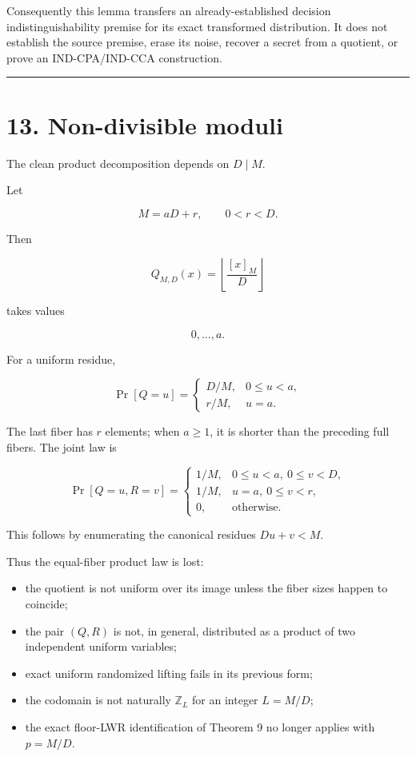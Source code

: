 \documentclass[11pt,a4paper]{article}
\providecommand{\tightlist}{\setlength{\itemsep}{0pt}\setlength{\parskip}{0pt}}
\begin{document}
Consequently this lemma transfers an already-established decision indistinguishability premise for its exact transformed distribution. It does not establish the source premise, erase its noise, recover a secret from a quotient, or prove an IND-CPA/IND-CCA construction.

\begin{center}\rule{0.5\linewidth}{0.5pt}\end{center}

\section{13. Non-divisible moduli}\label{non-divisible-moduli}

The clean product decomposition depends on \(D\mid M\).

Let

\[
M=aD+r,\qquad0<r<D.
\]

Then

\[
Q_{M,D}(x)
=
\left\lfloor\frac{[x]_M}{D}\right\rfloor
\]

takes values

\[
0,\ldots,a.
\]

For a uniform residue,

\[
\Pr[Q=u]
=
\begin{cases}
D/M,&0\le u<a,\\
r/M,&u=a.
\end{cases}
\]

The last fiber has \(r\) elements; when \(a\ge1\), it is shorter than the preceding full fibers. The joint law is

\[
\Pr[Q=u,R=v]=
\begin{cases}
1/M,&0\le u<a,\ 0\le v<D,\\
1/M,&u=a,\ 0\le v<r,\\
0,&\text{otherwise}.
\end{cases}
\]

This follows by enumerating the canonical residues \(Du+v<M\).

Thus the equal-fiber product law is lost:

\begin{itemize}
\tightlist
\item
  the quotient is not uniform over its image unless the fiber sizes happen to coincide;
\item
  the pair \((Q,R)\) is not, in general, distributed as a product of two independent uniform variables;
\item
  exact uniform randomized lifting fails in its previous form;
\item
  the codomain is not naturally \(\mathbb Z_L\) for an integer \(L=M/D\);
\item
  the exact floor-LWR identification of Theorem 9 no longer applies with \(p=M/D\).
\end{itemize}
\end{document}

